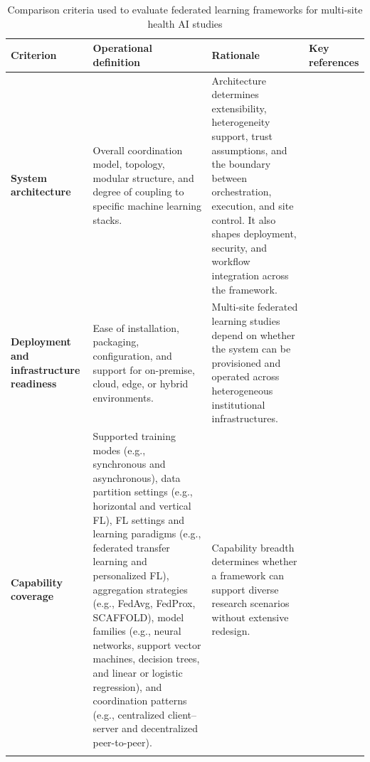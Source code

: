 \documentclass[preprint,5p, 10pt, times]{elsarticle}
\begin{document}
\begin{table}[t]
\centering
\caption{Comparison criteria used to evaluate federated learning frameworks for multi-site health AI studies
}
\label{tab:comparison_criteria}
\scriptsize
\setlength{\tabcolsep}{3pt}

\begin{tabularx}{\textwidth}{
>{\raggedright\arraybackslash}p{2.2cm}
>{\raggedright\arraybackslash}X
>{\raggedright\arraybackslash}X
>{\centering\arraybackslash}p{1.1cm}}
\toprule
\textbf{Criterion} & \textbf{Operational definition} & \textbf{Rationale} & \textbf{Key references} \\
\midrule

\textbf{System architecture}
& Overall coordination model, topology, modular structure, and degree of coupling to specific machine learning stacks.
& Architecture determines extensibility, heterogeneity support, trust assumptions, and the boundary between orchestration, execution, and site control. It also shapes deployment, security, and workflow integration across the framework.
& \cite{chai2024survey,mehdi2025comprehensive, antunes2022federated, mahmud2026survey, wang2022efficient} \\
\addlinespace[4pt]

\textbf{Deployment and infrastructure readiness}
& Ease of installation, packaging, configuration, and support for on-premise, cloud, edge, or hybrid environments.
& Multi-site federated learning studies depend on whether the system can be provisioned and operated across heterogeneous institutional infrastructures.
& \cite{zhang2022shifting,teo2024federated,schoenpflug2025navigating,mehdi2025comprehensive} \\
\addlinespace[4pt]

\textbf{Capability coverage}
& Supported training modes (e.g., synchronous and asynchronous), data partition settings (e.g., horizontal and vertical FL), FL settings and learning paradigms (e.g., federated transfer learning and personalized FL), aggregation strategies (e.g., FedAvg\cite{mcmahan2017communication}, FedProx\cite{li2020federated}, SCAFFOLD\cite{karimireddy2020scaffold}), model families (e.g., neural networks, support vector machines, decision trees, and linear or logistic regression), and coordination patterns (e.g., centralized client--server and decentralized peer-to-peer). 
& Capability breadth determines whether a framework can support diverse research scenarios without extensive redesign.
& \cite{teo2024federated,mehdi2025comprehensive,alsamhi2024federated,khan2023asynchronous,yu2024communication,raza2022designing,mahmud2026survey} \\
\addlinespace[4pt]


\end{tabularx}
\end{table}
\end{document}
